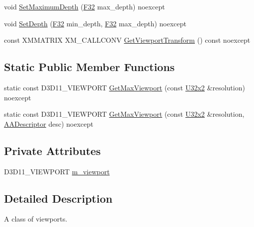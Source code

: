 \begin{DoxyCompactItemize}
\item 
void \hyperlink{classmage_1_1rendering_1_1_viewport_ab96df600f62ff91a4d073f2c51b5e95e}{Set\+Maximum\+Depth} (\hyperlink{namespacemage_aa97e833b45f06d60a0a9c4fc22ae02c0}{F32} max\+\_\+depth) noexcept
\item 
void \hyperlink{classmage_1_1rendering_1_1_viewport_a6e6edb1bb4f538b0639e42a00005c34e}{Set\+Depth} (\hyperlink{namespacemage_aa97e833b45f06d60a0a9c4fc22ae02c0}{F32} min\+\_\+depth, \hyperlink{namespacemage_aa97e833b45f06d60a0a9c4fc22ae02c0}{F32} max\+\_\+depth) noexcept
\item 
const X\+M\+M\+A\+T\+R\+IX X\+M\+\_\+\+C\+A\+L\+L\+C\+O\+NV \hyperlink{classmage_1_1rendering_1_1_viewport_ac4ea113f2c019b5b1d369898537ab5c3}{Get\+Viewport\+Transform} () const noexcept
\end{DoxyCompactItemize}
\subsection*{Static Public Member Functions}
\begin{DoxyCompactItemize}
\item 
static const D3\+D11\+\_\+\+V\+I\+E\+W\+P\+O\+RT \hyperlink{classmage_1_1rendering_1_1_viewport_ad565cc66f21bb3d3e00ae608ef926635}{Get\+Max\+Viewport} (const \hyperlink{namespacemage_a88e05bff0300120c013285d3dcad95c5}{U32x2} \&resolution) noexcept
\item 
static const D3\+D11\+\_\+\+V\+I\+E\+W\+P\+O\+RT \hyperlink{classmage_1_1rendering_1_1_viewport_a64a61ea814f07b9904d158e24853e0dc}{Get\+Max\+Viewport} (const \hyperlink{namespacemage_a88e05bff0300120c013285d3dcad95c5}{U32x2} \&resolution, \hyperlink{namespacemage_1_1rendering_a25c189fd1da946d7a8f0abdd4f0e6afa}{A\+A\+Descriptor} desc) noexcept
\end{DoxyCompactItemize}
\subsection*{Private Attributes}
\begin{DoxyCompactItemize}
\item 
D3\+D11\+\_\+\+V\+I\+E\+W\+P\+O\+RT \hyperlink{classmage_1_1rendering_1_1_viewport_ab0b20f21a771248d9e9659f1029a497d}{m\+\_\+viewport}
\end{DoxyCompactItemize}


\subsection{Detailed Description}
A class of viewports. 

